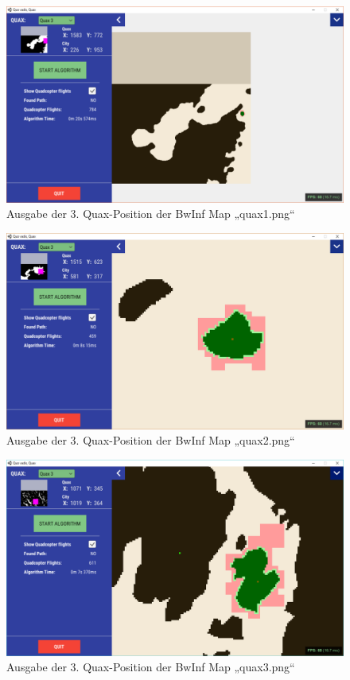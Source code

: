 \documentclass[a4paper,12pt]{article}
\begin{document}
\begin{figure}[H]
\centering
    \includegraphics[width=1\linewidth]{Bilder/Aufgabe3/Programm/quax1_03.png}
    \caption{Ausgabe der 3. Quax-Position der BwInf Map „quax1.png“}
\end{figure}
\begin{figure}[H]
\centering
    \includegraphics[width=1\linewidth]{Bilder/Aufgabe3/Programm/quax2_03.png}
    \caption{Ausgabe der 3. Quax-Position der BwInf Map „quax2.png“}
\end{figure}
\begin{figure}[H]
\centering
    \includegraphics[width=1\linewidth]{Bilder/Aufgabe3/Programm/quax3_03.png}
    \caption{Ausgabe der 3. Quax-Position der BwInf Map „quax3.png“}
\end{figure}
\end{document}
